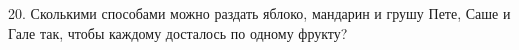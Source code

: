 20. Сколькими способами можно раздать яблоко, мандарин и грушу Пете, Саше и Гале так, чтобы каждому досталось по одному фрукту?\\
